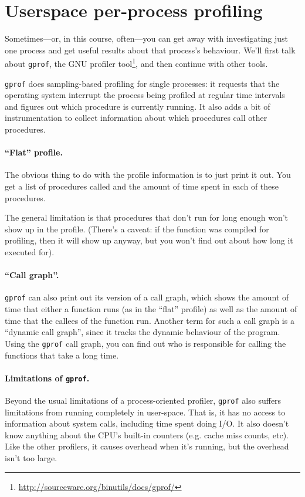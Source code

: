 \documentclass[a4paper]{report}
\begin{document}
\section*{Userspace per-process profiling}
Sometimes---or, in this course, often---you can get away with
investigating just one process and get useful results about that
process's behaviour.  We'll first talk about {\tt gprof}, the GNU
profiler
tool\footnote{\url{http://sourceware.org/binutils/docs/gprof/}}, and
then continue with other tools.

{\tt gprof} does sampling-based profiling for single processes: it
requests that the operating system interrupt the process being
profiled at regular time intervals and figures out which procedure is
currently running. It also adds a bit of instrumentation to collect
information about which procedures call other procedures.

\paragraph{``Flat'' profile.} The obvious thing to do with the
profile information is to just print it out. You get a list of
procedures called and the amount of time spent in each of these 
procedures.

The general limitation is that procedures that don't run for
long enough won't show up in the profile. (There's a caveat: if
the function was compiled for profiling, then it will show up
anyway, but you won't find out about how long it executed for).

\paragraph{``Call graph''.} {\tt gprof} can also print out 
its version of a call graph, which shows the amount of time that
either a function runs (as in the ``flat'' profile) as well as the
amount of time that the callees of the function run.  Another term for
such a call graph is a ``dynamic call graph'', since it tracks the
dynamic behaviour of the program.  Using the {\tt gprof} call graph,
you can find out who is responsible for calling the functions that
take a long time.

\paragraph{Limitations of {\tt gprof}.} Beyond the usual limitations
of a process-oriented profiler, {\tt gprof} also suffers limitations
from running completely in user-space. That is, it has no access to
information about system calls, including time spent doing I/O.
It also doesn't know anything about the CPU's built-in counters
(e.g. cache miss counts, etc). Like the other profilers, it causes
overhead when it's running, but the overhead isn't too large.
\end{document}
